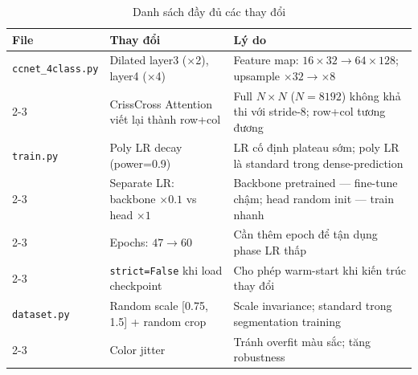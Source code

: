 \documentclass[12pt,a4paper]{article}
\begin{document}
\begin{table}[H]
  \centering
  \caption{Danh sách đầy đủ các thay đổi}
  \renewcommand{\arraystretch}{1.3}
  \begin{tabular}{p{3.5cm} p{4cm} p{5.5cm}}
    \toprule
    \textbf{File} & \textbf{Thay đổi} & \textbf{Lý do} \\
    \midrule
    \texttt{ccnet\_4class.py} &
      Dilated layer3 (×2), layer4 (×4) &
      Feature map: $16\times32 \to 64\times128$; upsample $\times32 \to \times8$ \\
    \cmidrule{2-3}
    & CrissCross Attention viết lại thành row+col &
      Full $N\times N$ ($N=8192$) không khả thi với stride-8; row+col tương đương \\
    \midrule
    \texttt{train.py} &
      Poly LR decay (power=0.9) &
      LR cố định plateau sớm; poly LR là standard trong dense-prediction \\
    \cmidrule{2-3}
    & Separate LR: backbone $\times0.1$ vs head $\times1$ &
      Backbone pretrained — fine-tune chậm; head random init — train nhanh \\
    \cmidrule{2-3}
    & Epochs: $47 \to 60$ &
      Cần thêm epoch để tận dụng phase LR thấp \\
    \cmidrule{2-3}
    & \texttt{strict=False} khi load checkpoint &
      Cho phép warm-start khi kiến trúc thay đổi \\
    \midrule
    \texttt{dataset.py} &
      Random scale {[}0.75, 1.5{]} + random crop &
      Scale invariance; standard trong segmentation training \\
    \cmidrule{2-3}
    & Color jitter &
      Tránh overfit màu sắc; tăng robustness \\
    \bottomrule
  \end{tabular}
\end{table}
\end{document}
